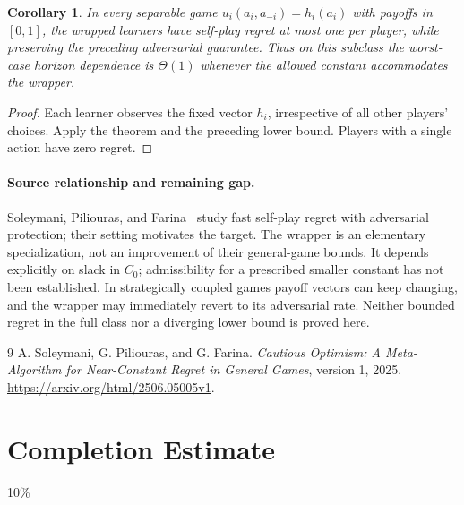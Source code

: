 \documentclass[11pt]{article}
\newtheorem{corollary}{Corollary}
\theoremstyle{definition}
\theoremstyle{remark}
\begin{document}
\begin{corollary}
In every separable game $u_i(a_i,a_{-i})=h_i(a_i)$ with payoffs in $[0,1]$, the wrapped learners have self-play regret at most one per player, while preserving the preceding adversarial guarantee. Thus on this subclass the worst-case horizon dependence is $\Theta(1)$ whenever the allowed constant accommodates the wrapper.
\end{corollary}
\begin{proof}
Each learner observes the fixed vector $h_i$, irrespective of all other players' choices. Apply the theorem and the preceding lower bound. Players with a single action have zero regret.
\end{proof}

\paragraph{Source relationship and remaining gap.}
Soleymani, Piliouras, and Farina~\cite{source} study fast self-play regret with adversarial protection; their setting motivates the target. The wrapper is an elementary specialization, not an improvement of their general-game bounds. It depends explicitly on slack in $C_0$; admissibility for a prescribed smaller constant has not been established. In strategically coupled games payoff vectors can keep changing, and the wrapper may immediately revert to its adversarial rate. Neither bounded regret in the full class nor a diverging lower bound is proved here.

\begin{thebibliography}{9}
 A. Soleymani, G. Piliouras, and G. Farina.
\emph{Cautious Optimism: A Meta-Algorithm for Near-Constant Regret in General Games}, version 1, 2025.
\url{https://arxiv.org/html/2506.05005v1}.
\end{thebibliography}

\section{Completion Estimate}
10\%
\end{document}
